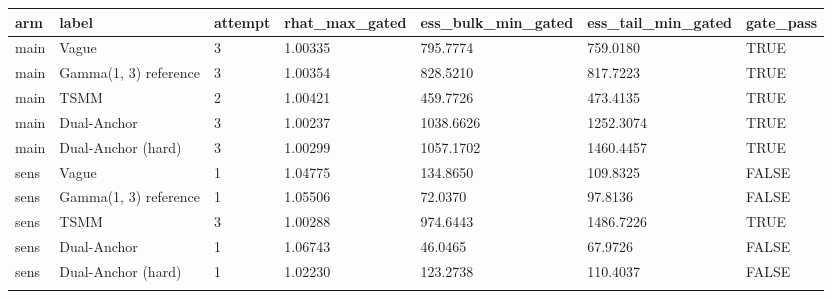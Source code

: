 \begin{longtable}{lllllll}
\toprule
arm & label & attempt & rhat\_max\_gated & ess\_bulk\_min\_gated & ess\_tail\_min\_gated & gate\_pass \\
\midrule\endhead
main & Vague & 3 & 1.00335 & 795.7774 & 759.0180 & TRUE \\ \addlinespace[3pt]
main & Gamma(1, 3) reference & 3 & 1.00354 & 828.5210 & 817.7223 & TRUE \\ \addlinespace[3pt]
main & TSMM & 2 & 1.00421 & 459.7726 & 473.4135 & TRUE \\ \addlinespace[3pt]
main & Dual-Anchor & 3 & 1.00237 & 1038.6626 & 1252.3074 & TRUE \\ \addlinespace[3pt]
main & Dual-Anchor (hard) & 3 & 1.00299 & 1057.1702 & 1460.4457 & TRUE \\ \addlinespace[3pt]
sens & Vague & 1 & 1.04775 & 134.8650 & 109.8325 & FALSE \\ \addlinespace[3pt]
sens & Gamma(1, 3) reference & 1 & 1.05506 & 72.0370 & 97.8136 & FALSE \\ \addlinespace[3pt]
sens & TSMM & 3 & 1.00288 & 974.6443 & 1486.7226 & TRUE \\ \addlinespace[3pt]
sens & Dual-Anchor & 1 & 1.06743 & 46.0465 & 67.9726 & FALSE \\ \addlinespace[3pt]
sens & Dual-Anchor (hard) & 1 & 1.02230 & 123.2738 & 110.4037 & FALSE \\ \addlinespace[3pt]
\bottomrule\end{longtable}
